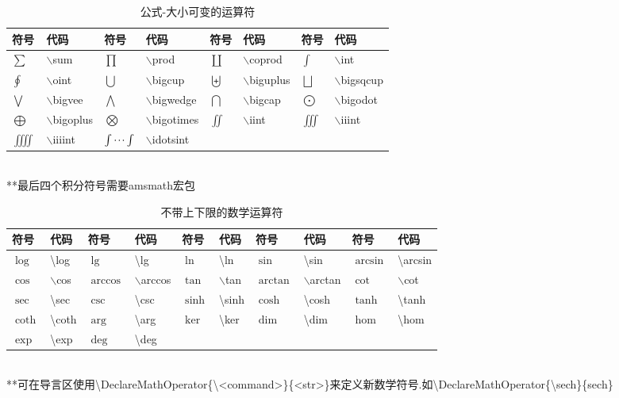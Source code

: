 \documentclass[UTF8,fontset=ubuntu]{ctexart}
\begin{document}
\begin{table}[H]
\begin{tabular}{l l l l l l l l}
	\hline
	符号 & 代码 & 符号 & 代码 & 符号 & 代码 & 符号 & 代码\\
	\hline
	$\sum$ & $\backslash$sum & $\prod$ & $\backslash$prod & $\coprod$ & $\backslash$coprod & $\int$ & $\backslash$int\\
	$\oint$ & $\backslash$oint & $\bigcup$ & $\backslash$bigcup & $\biguplus$ & $\backslash$biguplus & $\bigsqcup$ & $\backslash$bigsqcup\\
	$\bigvee$ & $\backslash$bigvee & $\bigwedge$ & $\backslash$bigwedge & $\bigcap$ & $\backslash$bigcap & $\bigodot$ & $\backslash$bigodot\\
	$\bigoplus$ & $\backslash$bigoplus & $\bigotimes$ & $\backslash$bigotimes & $\iint$ & $\backslash$iint & $\iiint$ & $\backslash$iiint\\
	$\iiiint$ & $\backslash$iiiint & $\idotsint$ & $\backslash$idotsint\\
	\hline
\end{tabular}\\[2mm]
**最后四个积分符号需要amsmath宏包
\caption{公式-大小可变的运算符}
\end{table}
\begin{table}[H]
\begin{tabular}{l l l l l l l l l l}
	\hline
	符号 & 代码 & 符号 & 代码 & 符号 & 代码 & 符号 & 代码 & 符号 & 代码\\
	\hline
	$\log$ & \textbackslash log & $\lg$ & \textbackslash lg & $\ln$ & \textbackslash ln & $\sin$ & \textbackslash sin & $\arcsin$ & \textbackslash arcsin\\
	$\cos$ & $\backslash$cos & $\arccos$ & $\backslash$arccos & $\tan$ & $\backslash$tan & $\arctan$ & $\backslash$arctan & $\cot$ & $\backslash$cot\\
	$\sec$ & \textbackslash sec & $\csc$ & \textbackslash csc & $\sinh$ & \textbackslash sinh & $\cosh$ & \textbackslash cosh & $\tanh$ & \textbackslash tanh\\
	$\coth$ & \textbackslash coth & $\arg$ & \textbackslash arg & $\ker$ & \textbackslash ker & $\dim$ & \textbackslash dim & $\hom$ & \textbackslash hom\\
	$\exp$ & \textbackslash exp & $\deg$ & \textbackslash deg\\
	\hline
\end{tabular}\\[2mm]
**可在导言区使用\textbackslash DeclareMathOperator\{\textbackslash \textless command\textgreater\}\{\textless str\textgreater\}来定义新数学符号.如\textbackslash DeclareMathOperator\{\textbackslash sech\}\{sech\}
\caption{不带上下限的数学运算符}
\end{table}
\end{document}
